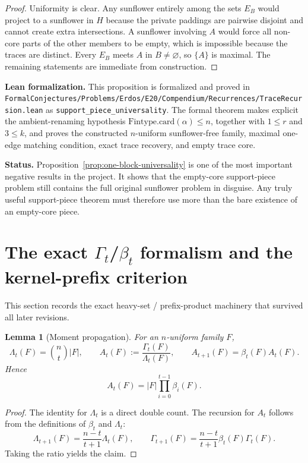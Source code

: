 \documentclass[11pt]{article}
\newtheorem{lemma}[theorem]{Lemma}
\theoremstyle{definition}
\newcommand{\1}{\mathbf{1}}
\newcommand{\status}[1]{\par\smallskip\noindent\textbf{Status.} #1\par\smallskip}
\newcommand{\leannote}[1]{\par\smallskip\noindent\textbf{Lean formalization.} #1\par\smallskip}
\begin{document}
\begin{proof}
Uniformity is clear. Any sunflower entirely among the sets $E_B$ would project to a sunflower in $H$ because the private paddings are pairwise disjoint and cannot create extra intersections. A sunflower involving $A$ would force all non-core parts of the other members to be empty, which is impossible because the traces are distinct. Every $E_B$ meets $A$ in $B\neq\varnothing$, so $\{A\}$ is maximal. The remaining statements are immediate from construction.
\end{proof}

\leannote{This proposition is formalized and proved in \texttt{FormalConjectures/Problems/Erdos/E20/Compendium/Recurrences/TraceRecursion.lean} as \texttt{support\_piece\_universality}. The formal theorem makes explicit the ambient-renaming hypothesis \(\mathrm{Fintype.card}(\alpha)\le n\), together with \(1\le r\) and \(3\le k\), and proves the constructed \(n\)-uniform sunflower-free family, maximal one-edge matching condition, exact trace recovery, and empty trace core.}

\status{Proposition~\ref{prop:one-block-universality} is one of the most important negative results in the project. It shows that the empty-core support-piece problem still contains the full original sunflower problem in disguise. Any truly useful support-piece theorem must therefore use more than the bare existence of an empty-core piece.}

\section{The exact $\Gamma_t$/$\beta_t$ formalism and the kernel-prefix criterion}\label{sec:beta-gamma}
This section records the exact heavy-set / prefix-product machinery that survived all later revisions.

\begin{lemma}[Moment propagation]
For an $n$-uniform family $F$,
\[
\Lambda_t(F)=\binom{n}{t}|F|,
\qquad
A_t(F):=\frac{\Gamma_t(F)}{\Lambda_t(F)},
\qquad
A_{t+1}(F)=\beta_t(F)A_t(F).
\]
Hence
\[
A_t(F)=|F|\prod_{i=0}^{t-1}\beta_i(F).
\]
\end{lemma}

\begin{proof}
The identity for $\Lambda_t$ is a direct double count. The recursion for $A_t$ follows from the definitions of $\beta_t$ and $\Lambda_t$:
\[
\Lambda_{t+1}(F)=\frac{n-t}{t+1}\Lambda_t(F),
\qquad
\Gamma_{t+1}(F)=\frac{n-t}{t+1}\beta_t(F)\Gamma_t(F).
\]
Taking the ratio yields the claim.
\end{proof}
\end{document}
